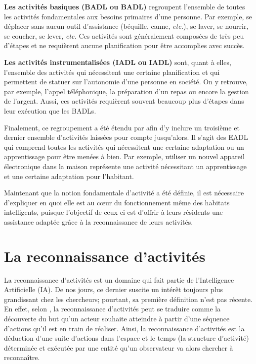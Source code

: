 {\textbf{Les activités basiques (\acl{BADL} ou \acs{BADL})} regroupent l'ensemble de toutes les activités fondamentales aux besoins primaires d'une personne. Par exemple, se déplacer sans aucun outil d'assistance (béquille, canne, \textit{etc.}), se laver, se nourrir, se coucher, se lever, \textit{etc.} Ces activités sont généralement composées de très peu d'étapes et ne requièrent aucune planification pour être accomplies avec succès.

{\textbf{Les activités instrumentalisées (\acl{IADL} ou \acs{IADL})} sont, quant à elles, l'ensemble des activités qui nécessitent une certaine planification et qui permettent de statuer sur l'autonomie d'une personne en société. On y retrouve, par exemple, l'appel téléphonique, la préparation d'un repas ou encore la gestion de l'argent. Aussi, ces activités requièrent souvent beaucoup plus d'étapes dans leur exécution que les \acsp{BADL}.

Finalement, ce regroupement a été étendu par \cite{Rogers1998} afin d'y inclure un troisième et dernier ensemble d'activités laissées pour compte jusqu'alors. Il s'agit des \ac{EADL} qui comprend toutes les activités qui nécessitent une certaine adaptation ou un apprentissage pour être menées à bien. Par exemple, utiliser un nouvel appareil électronique dans la maison représente une activité nécessitant un apprentissage et une certaine adaptation pour l'habitant.

Maintenant que la notion fondamentale d'activité a été définie, il est nécessaire d'expliquer en quoi elle est au c\oe{}ur du fonctionnement même des habitats intelligents, puisque l'objectif de ceux-ci est d'offrir à leurs résidents une assistance adaptée grâce à la reconnaissance de leurs activités.

\section{La reconnaissance d'activités}

La reconnaissance d'activités est un domaine qui fait partie de l'Intelligence Artificielle (\acs{IA}). De nos jours, ce dernier suscite un intérêt toujours plus grandissant chez les chercheurs; pourtant, sa première définition n'est pas récente. En effet, selon \cite{Schmidt1978}, la reconnaissance d'activités peut se traduire comme la découverte du but qu'un acteur souhaite atteindre à partir d'une séquence d'actions qu'il est en train de réaliser. Ainsi, la reconnaissance d'activités est la déduction d'une suite d'actions dans l'espace et le temps (la structure d'activité) déterminée et exécutée par une entité qu'un observateur va alors chercher à reconnaître.

}}
